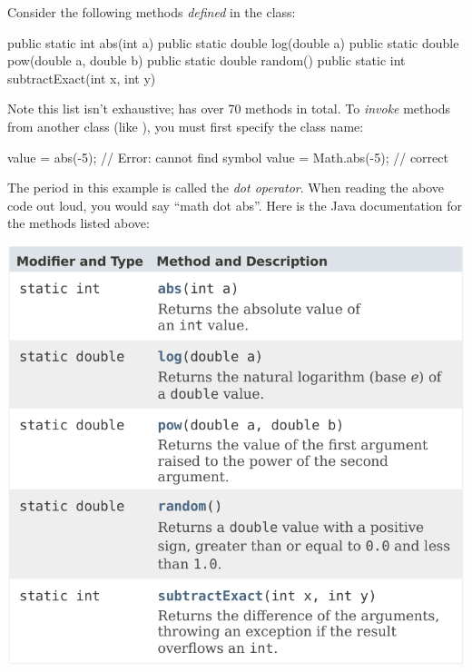 
Consider the following methods \emph{defined} in the  class:

\begin{javalst}
    public static int abs(int a)
    public static double log(double a)
    public static double pow(double a, double b)
    public static double random()
    public static int subtractExact(int x, int y)
\end{javalst}

Note this list isn't exhaustive;  has over 70 methods in total.
To \emph{invoke} methods from another class (like ), you must first specify the class name:

\begin{javalst}
    value = abs(-5);       // Error: cannot find symbol
    value = Math.abs(-5);  // correct
\end{javalst}

The period in this example is called the \emph{dot operator}. When reading the above code out loud, you would say ``math dot abs''.
Here is the Java documentation for the methods listed above:

\begin{center}
\includegraphics[scale=0.90]{math-javadoc.pdf}
\end{center}





